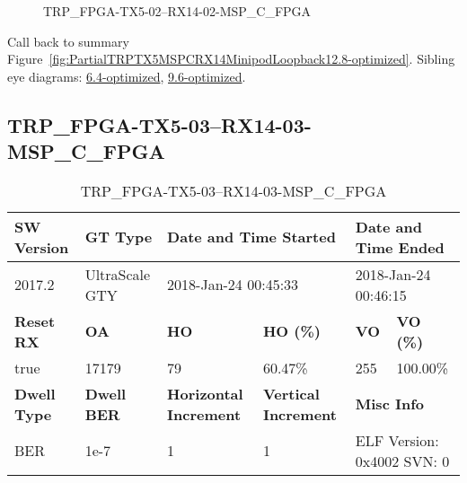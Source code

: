 \begin{figure}[h]
\caption{TRP\_FPGA-TX5-02--RX14-02-MSP\_C\_FPGA} \label{fig:TRPFPGATX502RX1402MSPCFPGA12.8-optimized}
\end{figure}

Call back to summary Figure~\ref{fig:PartialTRPTX5MSPCRX14MinipodLoopback12.8-optimized}.
Sibling eye diagrams: \hyperref[sec:TRPFPGATX502RX1402MSPCFPGA6.4-optimized]{6.4-optimized}, \hyperref[sec:TRPFPGATX502RX1402MSPCFPGA9.6-optimized]{9.6-optimized}.

\clearpage
\newpage


\subsection{TRP\_FPGA-TX5-03--RX14-03-MSP\_C\_FPGA}\label{sec:TRPFPGATX503RX1403MSPCFPGA12.8-optimized}

\begin{table}[h]
\centering
\caption{TRP\_FPGA-TX5-03--RX14-03-MSP\_C\_FPGA}
\label{tab:TRPFPGATX503RX1403MSPCFPGA12.8-optimized}
\begin{tabular}{@{}|l|l|l|l|l|l|@{}}
\toprule
\textbf{SW Version}                & \textbf{GT Type}   & \multicolumn{2}{l|}{\textbf{Date and Time Started}}            & \multicolumn{2}{l|}{\textbf{Date and Time Ended}}        \\ \midrule
2017.2                       & UltraScale GTY          & \multicolumn{2}{l|}{2018-Jan-24 00:45:33}                   & \multicolumn{2}{l|}{2018-Jan-24 00:46:15}               \\ \midrule
\textbf{Reset RX}                  & \textbf{OA} & \textbf{HO}   & \textbf{HO (\%)} & \textbf{VO} & \textbf{VO (\%)} \\ \midrule
true & 17179        & 79          & 60.47\%        & 255        & 100.00\%       \\ \midrule
\textbf{Dwell Type}                & \textbf{Dwell BER} & \textbf{Horizontal Increment} & \textbf{Vertical Increment}    & \multicolumn{2}{l|}{\textbf{Misc Info}}                  \\ \midrule
BER                            & 1e-7        & 1        & 1           & \multicolumn{2}{l|}{ELF Version: 0x4002 SVN: 0}                         \\ \bottomrule
\end{tabular}
\end{table}

